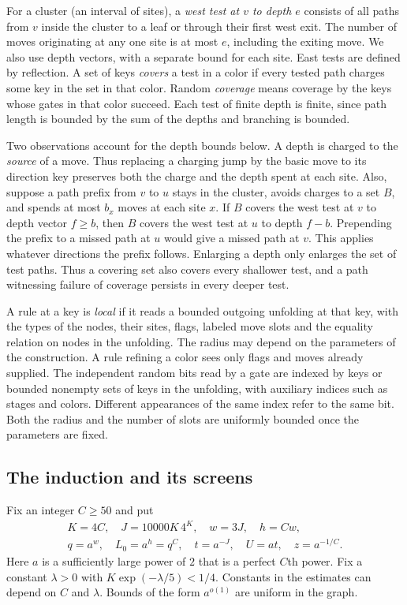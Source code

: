 For a cluster (an interval of sites), a \emph{west test at $v$ to depth
$e$} consists of all paths from $v$ inside the cluster to a leaf or
through their first west exit. The number of moves originating at any
one site is at most $e$, including the exiting move. We also use
depth vectors, with a separate bound for each site. East tests are
defined by reflection. A set of keys \emph{covers} a test in a color if
every tested path charges some key in the set in that color. Random
\emph{coverage} means coverage by the keys whose gates in that color
succeed. Each test of finite depth is finite, since path length is bounded
by the sum of the depths and branching is bounded.

Two observations account for the depth bounds below. A depth is
charged to the \emph{source} of a move. Thus replacing a charging jump
by the basic move to its direction key preserves both the charge and
the depth spent at each site. Also, suppose a path prefix from \(v\)
to \(u\) stays in the cluster, avoids charges to a set \(B\), and spends
at most \(b_x\) moves at each site \(x\). If \(B\) covers the west test
at \(v\) to depth vector \(f\ge b\), then \(B\) covers the west test at
\(u\) to depth \(f-b\). Prepending the prefix to a missed path at \(u\)
would give a missed path at \(v\). This applies whatever directions
the prefix follows. Enlarging a depth only enlarges the set of test
paths. Thus a covering set also covers every shallower test, and a
path witnessing failure of coverage persists in every deeper test.

A rule at a key is \emph{local} if it reads a bounded outgoing unfolding
at that key, with the types of the nodes, their sites, flags, labeled
move slots and the equality relation on nodes in the unfolding. The
radius may depend on the parameters of the construction. A rule
refining a color sees only flags and moves already supplied.
The independent random bits read by a gate are indexed by keys or
bounded nonempty sets of keys in the unfolding, with auxiliary indices
such as stages and colors. Different appearances of the same index refer
to the same bit. Both the radius and the number of slots are uniformly
bounded once the parameters are fixed.

\subsection{The induction and its screens}

Fix an integer $C\ge 50$ and put
\begin{equation}\label{eq:prob-parameters}
 \begin{gathered}
 K=4C,\quad J=10000K\,4^K,\quad w=3J,\quad h=Cw,\\
 q=a^w,\quad L_0=a^h=q^C,\quad t=a^{-J},\quad U=at,\quad z=a^{-1/C}.
 \end{gathered}
\end{equation}
Here $a$ is a sufficiently large power of $2$ that is a perfect
$C$th power. Fix a constant $\lambda>0$ with
$K\exp(-\lambda/5)<1/4$. Constants in the estimates can depend on $C$
and $\lambda$. Bounds of the form $a^{o(1)}$ are uniform in the graph.

